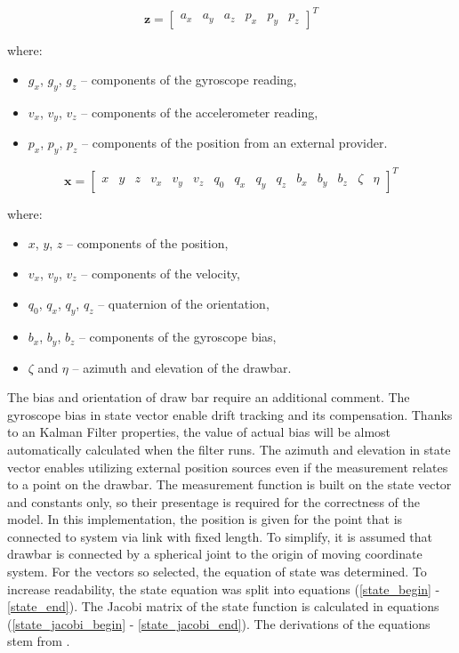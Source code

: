 \begin{equation}
	\bm{z} = \begin{bmatrix}
		a_x & a_y & a_z & p_x & p_y & p_z
	\end{bmatrix}^T
	\label{h_vec}
\end{equation}

where:
\begin{itemize}
	\item $g_x$, $g_y$, $g_z$ -- components of the gyroscope reading,
	\item $v_x$, $v_y$, $v_z$ -- components of the accelerometer reading,
	\item $p_x$, $p_y$, $p_z$ -- components of the position from an external provider.
\end{itemize}

\begin{equation}
	\bm{x} = \begin{bmatrix}
	x & y & z & v_x & v_y & v_z & q_0 & q_x & q_y & q_z & b_x & b_y & b_z & \zeta & \eta
	\end{bmatrix}^T
	\label{state_vec}
\end{equation}

where:
\begin{itemize}
	\item $x$, $y$, $z$ -- components of the position,
	\item $v_x$, $v_y$, $v_z$ -- components of the velocity,
	\item $q_0$, $q_x$, $q_y$, $q_z$ -- quaternion of the orientation,
	\item $b_x$, $b_y$, $b_z$ -- components of the gyroscope bias,
	\item $\zeta$ and $\eta$ -- azimuth and elevation of the drawbar.
\end{itemize}

The bias and orientation of draw bar require an additional comment. The gyroscope bias in state vector enable drift tracking and its compensation. Thanks to an Kalman Filter properties, the value of actual bias will be almost automatically calculated when the filter runs. The azimuth and elevation in state vector enables utilizing external position sources even if the measurement relates to a point on the drawbar. The measurement function is built on the state vector and constants only, so their presentage is required for the correctness of the model. In this implementation, the position is given for the point that is connected to system via link with fixed length. To simplify, it is assumed that drawbar is connected by a spherical joint to the origin of moving coordinate system. For the vectors so selected, the equation of state was determined. To increase readability, the state equation was split into equations (\ref{state_begin} - \ref{state_end}). The Jacobi matrix of the state function is calculated in equations (\ref{state_jacobi_begin} - \ref{state_jacobi_end}).  The derivations of the equations stem from \cite{ekf_poor}.

